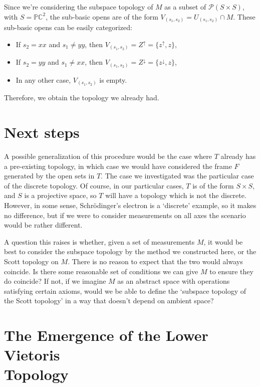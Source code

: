 \documentclass{article}
\theoremstyle{definition}
\theoremstyle{plain}
\newcommand{\C}{\mathbb{C}}
\newcommand{\ps}{\mathcal{P}}
\newcommand{\pr}{\mathbb{P}}
\begin{document}
Since we're considering the subspace topology of $M$ as a subset of $\ps(S \times S)$, with $S = \pr \C^2$, the sub-basic opens are of the form $V_{(s_1,s_2)} = U_{(s_1,s_2)} \cap M$. These sub-basic opens can be easily categorized:
\begin{itemize}
\item If $s_2 = xx$ and $s_1 \neq yy$, then $V_{(s_1,s_2)} = Z^\uparrow = \{z^\uparrow, z\}$,
\item If $s_2 = yy$ and $s_1 \neq xx$, then $V_{(s_1,s_2)} = Z^\downarrow = \{z^\downarrow, z\}$,
\item In any other case, $V_{(s_1,s_2)}$ is empty.
\end{itemize}

Therefore, we obtain the topology we already had.

\section{Next steps}

A possible generalization of this procedure would be the case where $T$ already has a pre-existing topology, in which case we would have considered the frame $F$ generated by the open sets in $T$. The case we investigated was the particular case of the discrete topology. Of course, in our particular cases, $T$ is of the form $S \times S$, and $S$ is a projective space, so $T$ will have a topology which is not the discrete. However, in some sense, Schrödinger's electron is a `discrete' example, so it makes no difference, but if we were to consider measurements on all axes the scenario would be rather different.

A question this raises is whether, given a set of measurements $M$, it would be best to consider the subspace topology by the method we constructed here, or the Scott topology on $M$. There is no reason to expect that the two would always coincide. Is there some reasonable set of conditions we can give $M$ to ensure they do coincide? If not, if we imagine $M$ as an abstract space with operations satisfying certain axioms, would we be able to define the `subspace topology of the Scott topology' in a way that doesn't depend on ambient space?

\section{The Emergence of the Lower Vietoris\\Topology}
\end{document}
